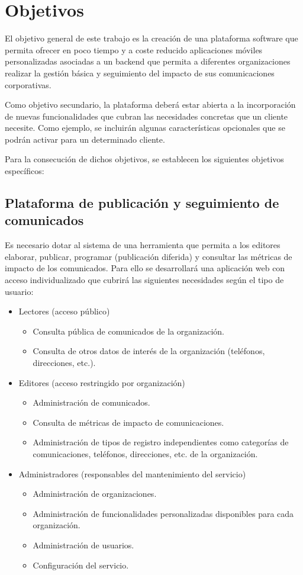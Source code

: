 \chapter{Objetivos}
El objetivo general de este trabajo es la creación de una plataforma software que permita ofrecer en poco tiempo y a coste reducido aplicaciones móviles personalizadas asociadas a un backend que permita a diferentes organizaciones realizar la gestión básica y seguimiento del impacto de sus comunicaciones corporativas.

Como objetivo secundario, la plataforma deberá estar abierta a la incorporación de nuevas funcionalidades que cubran las necesidades concretas que un cliente necesite. Como ejemplo, se incluirán algunas características opcionales que se podrán activar para un determinado cliente.

Para la consecución de dichos objetivos, se establecen los siguientes objetivos específicos:

\section{Plataforma de publicación y seguimiento de comunicados}
Es necesario dotar al sistema de una herramienta que permita a los editores elaborar, publicar, programar (publicación diferida) y consultar las métricas de impacto de los comunicados. Para ello se desarrollará una aplicación web con acceso individualizado que cubrirá las siguientes necesidades según el tipo de usuario:
\begin{itemize}
    \item Lectores (acceso público)
    \begin{itemize}
        \item Consulta pública de comunicados de la organización.
        \item Consulta de otros datos de interés de la organización (teléfonos, direcciones, etc.).
    \end{itemize}
    \item Editores (acceso restringido por organización)
    \begin{itemize}
        \item Administración de comunicados.
        \item Consulta de métricas de impacto de comunicaciones.
        \item Administración de tipos de registro independientes como categorías de comunicaciones, teléfonos, direcciones, etc. de la organización.
    \end{itemize}
    \item Administradores (responsables del mantenimiento del servicio)
    \begin{itemize}
        \item Administración de organizaciones.
        \item Administración de funcionalidades personalizadas disponibles para cada organización.
        \item Administración de usuarios.
        \item Configuración del servicio.
    \end{itemize}
\end{itemize}

